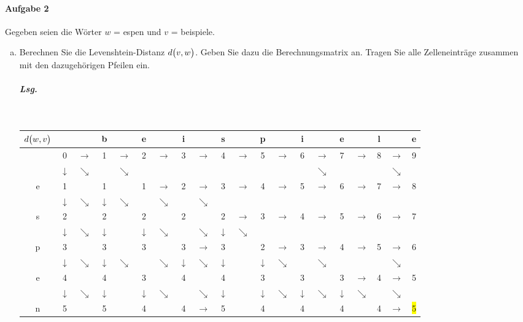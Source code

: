 \documentclass{scrreprt}
\begin{document}
\paragraph{Aufgabe 2}
Gegeben seien die Wörter $w$ = espen und $v$ = beispiele.
\begin{enumerate}[a)]
\item Berechnen Sie die Levenshtein-Distanz $d\qty\big(v, w)$.
  Geben Sie dazu die Berechnungsmatrix an.
  Tragen Sie alle Zelleneinträge zusammen mit den dazugehörigen Pfeilen ein.

  \subparagraph{Lsg.} \:\\
  \begin{tabular}{c|ccccccccccccccccccc}
    $d\qty\big(w, v)$
      & & & b & & e & & i & & s & & p & & i & & e & & l & & e \\
    \hline
      & 0 & \color{blue} $\rightarrow$ & 1 & $\rightarrow$ & 2 & $\rightarrow$ & 3 & $\rightarrow$ & 4 & $\rightarrow$ & 5 & $\rightarrow$ & 6 & $\rightarrow$ & 7 & $\rightarrow$ & 8 & $\rightarrow$ & 9 \\
      & $\downarrow$ & $\searrow$ & & \color{blue} $\searrow$ & & & & & & & & & & $\searrow$ & & & & $\searrow$ \\
    e & 1 & & 1 & & 1 & \color{blue} $\rightarrow$ & 2 & $\rightarrow$ & 3 & $\rightarrow$ & 4 & $\rightarrow$ & 5 & $\rightarrow$ & 6 & $\rightarrow$ & 7 & $\rightarrow$ & 8 \\
      & $\downarrow$ & $\searrow$ & $\downarrow$ & $\searrow$ & & $\searrow$ & & \color{blue} $\searrow$ \\
    s & 2 & & 2 & & 2 &  & 2 & & 2 & $\rightarrow$ & 3 & $\rightarrow$ & 4 & $\rightarrow$ & 5 & $\rightarrow$ & 6 & $\rightarrow$ & 7 \\
      & $\downarrow$ & $\searrow$ & $\downarrow$ & & $\downarrow$ & $\searrow$ & & $\searrow$ & $\downarrow$ & \color{blue} $\searrow$ \\
    p & 3 & & 3 & & 3 & & 3 & $\rightarrow$ & 3 & & 2 & \color{blue} $\rightarrow$ & 3 & $\rightarrow$ & 4 & $\rightarrow$ & 5 & $\rightarrow$ & 6 \\
      & $\downarrow$ & $\searrow$ & $\downarrow$ & $\searrow$ & & $\searrow$ & $\downarrow$ & $\searrow$ & $\downarrow$ & & $\downarrow$ & $\searrow$ & & \color{blue} $\searrow$ & & & & $\searrow$ \\
    e & 4 & & 4 & & 3 & & 4 & & 4 & & 3 & & 3 & & 3 &\color{red} $\rightarrow$ & \colorbox{green!30}{4} & $\rightarrow$ & 5 \\
      & $\downarrow$ & $\searrow$ & $\downarrow$ & & $\downarrow$ & $\searrow$ & & $\searrow$ & $\downarrow$ & & $\downarrow$ & $\searrow$ & $\downarrow$ & $\searrow$ & $\downarrow$ & \color{red} $\searrow$ & & \color{red} $\searrow$ \\
    n & 5 & & 5 & & 4 & & 4 & $\rightarrow$ & 5 & & 4 & & 4 & & 4 & & 4 & \color{red} $\rightarrow$ & \colorbox{yellow}{5} \\
  \end{tabular}


\end{enumerate}
\end{document}
